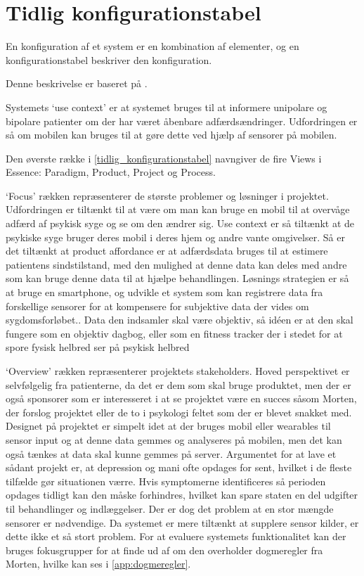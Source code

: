 \section{Tidlig konfigurationstabel}
En konfiguration af et system er en kombination af elementer, og en konfigurationstabel beskriver den konfiguration.

Denne beskrivelse er baseret på  \citet[Afsnit 3.2, Side 16-21]{art:essence}.

Systemets `use context' er at systemet bruges til at informere unipolare og bipolare patienter om der har været åbenbare adfærdsændringer. Udfordringen er så om mobilen kan bruges til at gøre dette ved hjælp af sensorer på mobilen.

Den øverste række i \cref{tidlig_konfigurationstabel} navngiver de fire Views i Essence: Paradigm, Product, Project og Process.

`Focus' rækken repræsenterer de største problemer og løsninger i projektet. 
Udfordringen er tiltænkt til at være om man kan bruge en mobil til at overvåge adfærd af psykisk syge og se om den ændrer sig. 
Use context er så tiltænkt at de psykiske syge bruger deres mobil i deres hjem og andre vante omgivelser. 
Så er det tiltænkt at product affordance er at adfærdsdata bruges til at estimere patientens sindstilstand, med den mulighed at denne data kan deles med andre som kan bruge denne data til at hjælpe behandlingen. 
Løsnings strategien er så at bruge en smartphone, og udvikle et system som kan registrere data fra forskellige sensorer for at kompensere for subjektive data der vides om sygdomsforløbet..
Data den indsamler skal være objektiv, så idéen er at den skal fungere som en objektiv dagbog, eller som en fitness tracker der i stedet for at spore fysisk helbred ser på psykisk helbred 

`Overview' rækken repræsenterer projektets stakeholders. 
Hoved perspektivet er selvfølgelig fra patienterne, da det er dem som skal bruge produktet, men der er også sponsorer som er interesseret i at se projektet være en succes såsom Morten, der forslog projektet eller de to i psykologi feltet som der er blevet snakket med. 
Designet på projektet er simpelt idet at der bruges mobil eller wearables til sensor input og at denne data gemmes og analyseres på mobilen, men det kan også tænkes at data skal kunne gemmes på server. 
Argumentet for at lave et sådant projekt er, at depression og mani ofte opdages for sent, hvilket i de fleste tilfælde gør situationen værre.
Hvis symptomerne identificeres så perioden opdages tidligt kan den måske forhindres, hvilket kan spare staten en del udgifter til behandlinger og indlæggelser.
Der er dog det problem at en stor mængde sensorer er nødvendige.
Da systemet er mere tiltænkt at supplere sensor kilder, er dette ikke et så stort problem.
For at evaluere systemets funktionalitet kan der bruges fokusgrupper for at finde ud af om den overholder dogmeregler fra Morten, hvilke kan ses i \cref{app:dogmeregler}.

